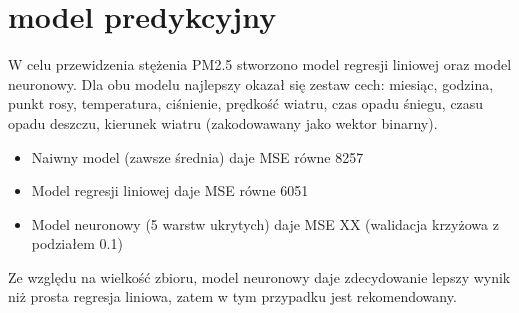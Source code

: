 \documentclass{beamer}
\begin{document}
\section{model predykcyjny}
\begin{frame}
	W celu przewidzenia stężenia PM2.5 stworzono model regresji liniowej oraz model neuronowy. Dla obu modelu najlepszy okazał się zestaw cech:
	miesiąc, godzina, punkt rosy, temperatura, ciśnienie, prędkość wiatru, czas opadu śniegu, czasu opadu deszczu, kierunek wiatru (zakodowawany jako wektor binarny).
	\begin{itemize}
		\item Naiwny model (zawsze średnia) daje MSE równe 8257
		\item Model regresji liniowej daje MSE równe 6051
		\item Model neuronowy (5 warstw ukrytych) daje MSE XX (walidacja krzyżowa z podziałem 0.1)
	\end{itemize}
	Ze względu na wielkość zbioru, model neuronowy daje zdecydowanie lepszy wynik niż prosta regresja liniowa,
	zatem w tym przypadku jest rekomendowany.
\end{frame}
\end{document}
